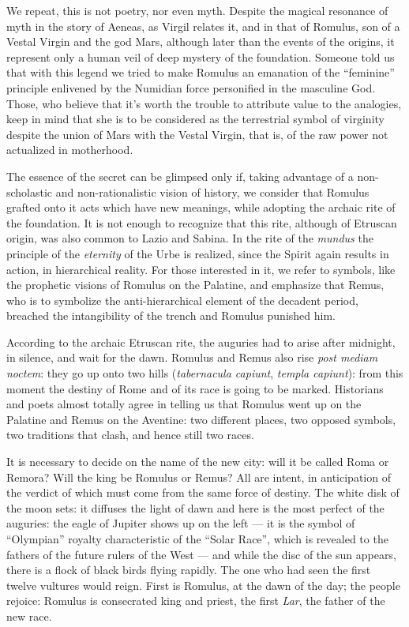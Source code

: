 We repeat, this is not poetry, nor even myth. Despite the magical resonance of myth in the story of Aeneas, as Virgil relates it, and in that of Romulus, son of a Vestal Virgin and the god Mars, although later than the events of the origins, it represent only a human veil of deep mystery of the foundation. Someone told us that with this legend we tried to make Romulus an emanation of the ``feminine'' principle enlivened by the Numidian force personified in the masculine God. Those, who believe that it's worth the trouble to attribute value to the analogies, keep in mind that she is to be considered as the terrestrial symbol of virginity despite the union of Mars with the Vestal Virgin, that is, of the raw power not actualized in motherhood.

The essence of the secret can be glimpsed only if, taking advantage of a non-scholastic and non-rationalistic vision of history, we consider that Romulus grafted onto it acts which have new meanings, while adopting the archaic rite of the foundation. It is not enough to recognize that this rite, although of Etruscan origin, was also common to Lazio and Sabina. In the rite of the \emph{mundus} the principle of the \emph{eternity} of the Urbe is realized, since the Spirit again results in action, in hierarchical reality. For those interested in it, we refer to symbols, like the prophetic visions of Romulus on the Palatine, and emphasize that Remus, who is to symbolize the anti-hierarchical element of the decadent period, breached the intangibility of the trench and Romulus punished him.

According to the archaic Etruscan rite, the auguries had to arise after midnight, in silence, and wait for the dawn. Romulus and Remus also rise \emph{post mediam noctem}: they go up onto two hills (\emph{tabernacula capiunt}, \emph{templa capiunt}): from this moment the destiny of Rome and of its race is going to be marked. Historians and poets almost totally agree in telling us that Romulus went up on the Palatine and Remus on the Aventine: two different places, two opposed symbols, two traditions that clash, and hence still two races.

It is necessary to decide on the name of the new city: will it be called Roma or Remora? Will the king be Romulus or Remus? All are intent, in anticipation of the verdict of which must come from the same force of destiny. The white disk of the moon sets: it diffuses the light of dawn and here is the most perfect of the auguries: the eagle of Jupiter shows up on the left --- it is the symbol of ``Olympian'' royalty characteristic of the ``Solar Race'', which is revealed to the fathers of the future rulers of the West --- and while the disc of the sun appears, there is a flock of black birds flying rapidly. The one who had seen the first twelve vultures would reign. First is Romulus, at the dawn of the day; the people rejoice: Romulus is consecrated king and priest, the first \emph{Lar}, the father of the new race.

